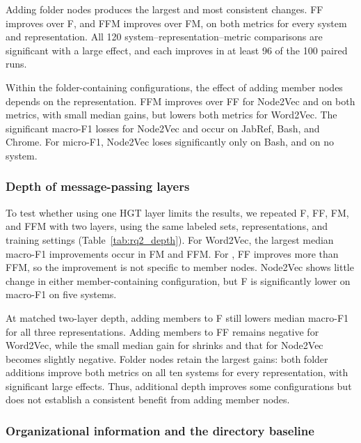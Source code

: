Adding folder nodes produces the largest and most consistent changes. FF improves over F, and FFM improves over FM, on both metrics for every system and representation. All 120 system--representation--metric comparisons are significant with a large effect, and each improves in at least 96 of the 100 paired runs.
 
Within the folder-containing configurations, the effect of adding member nodes depends on the representation. FFM improves over FF for Node2Vec and \ft{} on both metrics, with small median gains, but lowers both metrics for Word2Vec. The significant macro-F1 losses for Node2Vec and \ft{} occur on JabRef, Bash, and Chrome. For micro-F1, Node2Vec loses significantly only on Bash, and \ft{} on no system.

\subsubsection{Depth of message-passing layers} 
To test whether using one HGT layer limits the results, we repeated F, FF, FM, and FFM with two layers, using the same labeled sets, representations, and training settings (Table~\ref{tab:rq2_depth}). For Word2Vec, the largest median macro-F1 improvements occur in FM and FFM. For \ft{}, FF improves more than FFM, so the improvement is not specific to member nodes. Node2Vec shows little change in either member-containing configuration, but F is significantly lower on macro-F1 on five systems.

At matched two-layer depth, adding members to F still lowers median macro-F1 for all three representations. Adding members to FF remains negative for Word2Vec, while the small median gain for \ft{} shrinks and that for Node2Vec becomes slightly negative. Folder nodes retain the largest gains: both folder additions improve both metrics on all ten systems for every representation, with significant large effects. Thus, additional depth improves some configurations but does not establish a consistent benefit from adding member nodes.


\subsubsection{Organizational information and the directory baseline\label{sec:directory_errors}}


